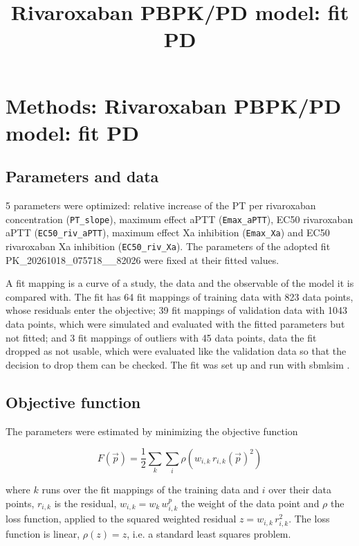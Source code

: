 \documentclass{article}
\title{Rivaroxaban PBPK/PD model: fit PD}
\date{}
\begin{document}
\maketitle

\section{Methods: Rivaroxaban PBPK/PD model: fit PD}

\subsection{Parameters and data}

5 parameters were optimized: relative increase of the PT per rivaroxaban concentration (\texttt{PT\_slope}), maximum effect aPTT (\texttt{Emax\_aPTT}), EC50 rivaroxaban aPTT (\texttt{EC50\_riv\_aPTT}), maximum effect Xa inhibition (\texttt{Emax\_Xa}) and EC50 rivaroxaban Xa inhibition (\texttt{EC50\_riv\_Xa}). The parameters of the adopted fit PK\_20261018\_075718\_\_82026 were fixed at their fitted values.

A fit mapping is a curve of a study, the data and the observable of the model it is compared with. The fit has 64 fit mappings of training data with 823 data points, whose residuals enter the objective; 39 fit mappings of validation data with 1043 data points, which were simulated and evaluated with the fitted parameters but not fitted; and 3 fit mappings of outliers with 45 data points, data the fit dropped as not usable, which were evaluated like the validation data so that the decision to drop them can be checked. The fit was set up and run with sbmlsim \cite{Koenig2026_sbmlsim}.

\subsection{Objective function}

The parameters were estimated by minimizing the objective function

\begin{equation}
F(\vec{p}) = \frac{1}{2} \sum_{k} \sum_{i} \rho\left(w_{i,k}\, r_{i,k}(\vec{p})^2\right)
\end{equation}

where $k$ runs over the fit mappings of the training data and $i$ over their data points, $r_{i,k}$ is the residual, $w_{i,k} = w_k\, w^{p}_{i,k}$ the weight of the data point and $\rho$ the loss function, applied to the squared weighted residual $z = w_{i,k}\, r_{i,k}^2$. The loss function is linear, $\rho(z) = z$, i.e. a standard least squares problem.
\end{document}
